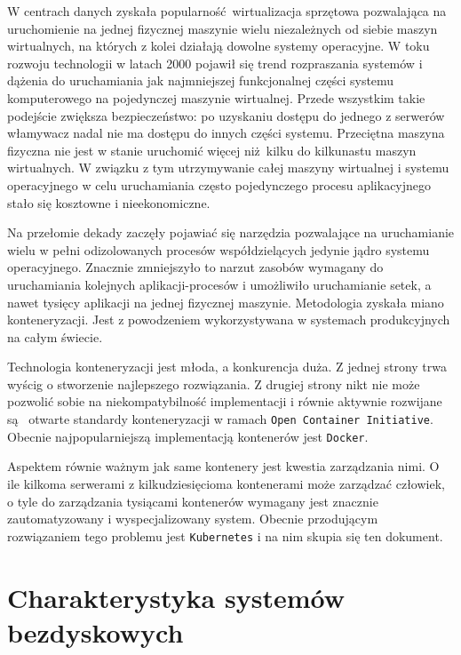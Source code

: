 \documentclass[a4paper,12pt,twoside,openany]{report}
\newcommand{\passthrough}[1]{#1}
\renewcommand{\href}[2]{#2\footnote{\url{#1}}}
\let\footnote=\endnote
\begin{document}
W centrach danych zyskała popularność~wirtualizacja sprzętowa
pozwalająca na uruchomienie na jednej fizycznej maszynie wielu
niezależnych od siebie maszyn wirtualnych, na których z kolei działają
dowolne systemy operacyjne. W toku rozwoju technologii w latach 2000
pojawił się trend rozpraszania systemów i dążenia do uruchamiania jak
najmniejszej funkcjonalnej części systemu komputerowego na pojedynczej
maszynie wirtualnej. Przede wszystkim takie podejście zwiększa
bezpieczeństwo: po uzyskaniu dostępu do jednego z serwerów włamywacz
nadal nie ma dostępu do innych części systemu. Przeciętna maszyna
fizyczna nie jest w stanie uruchomić więcej niż~kilku do kilkunastu
maszyn wirtualnych. W związku z tym utrzymywanie całej maszyny
wirtualnej i systemu operacyjnego w celu uruchamiania często
pojedynczego procesu aplikacyjnego stało się kosztowne i nieekonomiczne.

Na przełomie dekady zaczęły pojawiać się narzędzia pozwalające na
uruchamianie wielu w pełni odizolowanych procesów współdzielących
jedynie jądro systemu operacyjnego. Znacznie zmniejszyło to narzut
zasobów wymagany do uruchamiania kolejnych aplikacji-procesów i
umożliwiło uruchamianie setek, a nawet tysięcy aplikacji na jednej
fizycznej maszynie. Metodologia zyskała miano konteneryzacji. Jest z
powodzeniem wykorzystywana w systemach produkcyjnych na całym świecie.

Technologia konteneryzacji jest młoda, a konkurencja duża. Z jednej
strony trwa wyścig o stworzenie najlepszego rozwiązania. Z drugiej
strony nikt nie może pozwolić sobie na niekompatybilność implementacji i
równie aktywnie rozwijane są~ otwarte standardy konteneryzacji w ramach
\href{https://www.opencontainers.org/about}{\passthrough{\lstinline!Open Container Initiative!}}.
Obecnie najpopularniejszą implementacją kontenerów jest
\passthrough{\lstinline!Docker!}.

Aspektem równie ważnym jak same kontenery jest kwestia zarządzania nimi.
O ile kilkoma serwerami z kilkudziesięcioma kontenerami może zarządzać
człowiek, o tyle do zarządzania tysiącami kontenerów wymagany jest
znacznie zautomatyzowany i wyspecjalizowany system. Obecnie przodującym
rozwiązaniem tego problemu jest \passthrough{\lstinline!Kubernetes!} i
na nim skupia się ten dokument.

\hypertarget{charakterystyka-systemuxf3w-bezdyskowych}{%
\section{Charakterystyka systemów
bezdyskowych}\label{charakterystyka-systemuxf3w-bezdyskowych}}
\end{document}
